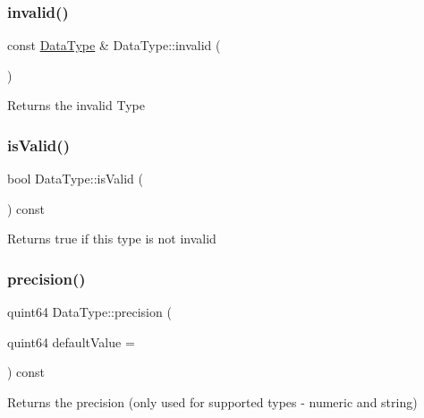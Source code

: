 \subsubsection{\texorpdfstring{invalid()}{invalid()}}
{\footnotesize\ttfamily const \hyperlink{class_data_type}{Data\+Type} \& Data\+Type\+::invalid (\begin{DoxyParamCaption}{ }\end{DoxyParamCaption})\hspace{0.3cm}{\ttfamily [static]}}

\begin{DoxyReturn}{Returns}
the invalid Type 
\end{DoxyReturn}
\mbox{\label{class_data_type_ad7629e3562fdd2ad8afea12050dec31b}} 
\subsubsection{\texorpdfstring{is\+Valid()}{isValid()}}
{\footnotesize\ttfamily bool Data\+Type\+::is\+Valid (\begin{DoxyParamCaption}{ }\end{DoxyParamCaption}) const}

\begin{DoxyReturn}{Returns}
true if this type is not invalid 
\end{DoxyReturn}
\mbox{\label{class_data_type_a14a632d64fb970501b78c7b6f18d3ca7}} 
\subsubsection{\texorpdfstring{precision()}{precision()}}
{\footnotesize\ttfamily quint64 Data\+Type\+::precision (\begin{DoxyParamCaption}\item[{quint64}]{default\+Value = {} }\end{DoxyParamCaption}) const}

\begin{DoxyReturn}{Returns}
the precision (only used for supported types -\/ numeric and string) 
\end{DoxyReturn}
\mbox{\label{class_data_type_ad7bd76d9d549701b91bd9ede3dce889a}} 
